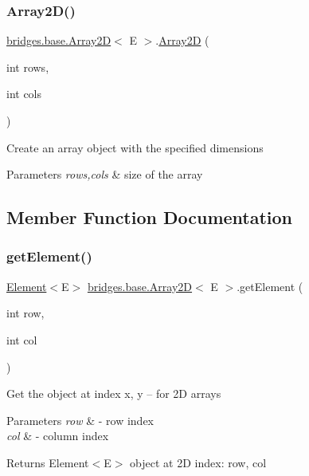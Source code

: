 \subsubsection{\texorpdfstring{Array2\+D()}{Array2D()}\hspace{0.1cm}{\footnotesize\ttfamily [2/2]}}
{\footnotesize\ttfamily \hyperlink{classbridges_1_1base_1_1_array2_d}{bridges.\+base.\+Array2D}$<$ E $>$.\hyperlink{classbridges_1_1base_1_1_array2_d}{Array2D} (\begin{DoxyParamCaption}\item[{int}]{rows,  }\item[{int}]{cols }\end{DoxyParamCaption})}

Create an array object with the specified dimensions


\begin{DoxyParams}{Parameters}
{\em rows,cols} & size of the array \\
\hline
\end{DoxyParams}


\subsection{Member Function Documentation}
\mbox{\label{classbridges_1_1base_1_1_array2_d_a592b728c34d26a16e25daa1549073f51}} 
\subsubsection{\texorpdfstring{get\+Element()}{getElement()}}
{\footnotesize\ttfamily \hyperlink{classbridges_1_1base_1_1_element}{Element}$<$E$>$ \hyperlink{classbridges_1_1base_1_1_array2_d}{bridges.\+base.\+Array2D}$<$ E $>$.get\+Element (\begin{DoxyParamCaption}\item[{int}]{row,  }\item[{int}]{col }\end{DoxyParamCaption})}

Get the object at index x, y -- for 2D arrays


\begin{DoxyParams}{Parameters}
{\em row} & -\/ row index \\
\hline
{\em col} & -\/ column index \\
\hline
\end{DoxyParams}
\begin{DoxyReturn}{Returns}
Element$<$\+E$>$ object at 2D index\+: row, col 
\end{DoxyReturn}
\mbox{\label{classbridges_1_1base_1_1_array2_d_a4f29fd9f736fdf46988ef6b3400684c3}} 
